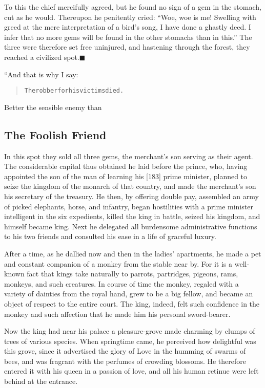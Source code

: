 \documentclass[article, twoside, 14pt]{memoir}
\newcommand{\qed}{\hfill \ensuremath{\blacksquare}}
\renewenvironment{verbatim}{%
\begin{quote}%
\vskip -10pt%
\begin{alltt}\normalfont\large}{\end{alltt}%
\end{quote}%
\vskip -10pt
} %
\begin{document}
To this the chief mercifully agreed, but he found no sign of a gem
in the stomach, cut as he would. Thereupon he penitently cried:
``Woe, woe is me! Swelling with greed at the mere interpretation of a bird's song, I have done a ghastly deed. I infer that no more gems will be found in the other stomachs than in this.''
The three were therefore set free uninjured, and hastening through
the forest, they reached a civilized spot.\hyperref[s33]{\qed}

“And that is why I say:

\begin{verbatim}
The robber for his victims died.
\end{verbatim}
Better the sensible enemy than

\subsection{The Foolish Friend}

\label{s34}

In this spot they sold all three gems, the merchant's son serving
as their agent. The considerable capital thus obtained he laid
before the prince, who, having appointed the son of the man of
learning his [183] prime minister, planned to seize the kingdom of
the monarch of that country, and made the merchant's son his
secretary of the treasury. He then, by offering double pay,
assembled an army of picked elephants, horse, and infantry, began
hostilities with a prime minister intelligent in the six
expedients, killed the king in battle, seized his kingdom, and
himself became king. Next he delegated all burdensome
administrative functions to his two friends and consulted his ease
in a life of graceful luxury.

After a time, as he dallied now and then in the ladies' apartments,
he made a pet and constant companion of a monkey from the stable
near by. For it is a well-known fact that kings take naturally to
parrots, partridges, pigeons, rams, monkeys, and such creatures. In
course of time the monkey, regaled with a variety of dainties from
the royal hand, grew to be a big fellow, and became an object of
respect to the entire court. The king, indeed, felt such confidence
in the monkey and such affection that he made him his personal
sword-bearer.

Now the king had near his palace a pleasure-grove made charming by
clumps of trees of various species. When springtime came, he
perceived how delightful was this grove, since it advertised the
glory of Love in the humming of swarms of bees, and was fragrant
with the perfumes of crowding blossoms. He therefore entered it
with his queen in a passion of love, and all his human retinue were
left behind at the entrance.
\end{document}

